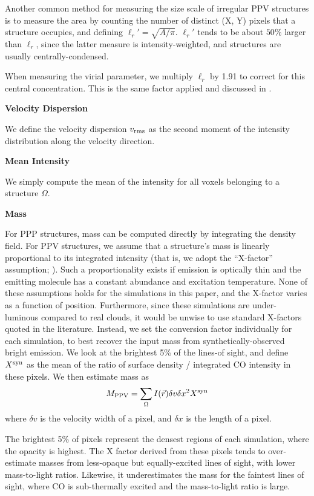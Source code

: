 Another common method for measuring the size scale of irregular PPV structures is to measure the area by counting the
number of distinct (X, Y) pixels that a structure occupies, and defining $\ell_r' = \sqrt{A/\pi}$. $\ell_r'$ tends to be about $50\%$
larger than $\ell_r$, since the latter measure is intensity-weighted, and structures are usually centrally-condensed.

When measuring the virial parameter, we multiply $\ell_r$ by 1.91 to correct for this central concentration. This is the same factor
applied and discussed in \cite{http://adsabs.harvard.edu/abs/2008ApJ...679.1338R}.

\textbf{Velocity Dispersion}

We define the velocity dispersion $v_{\rm rms}$ as the second moment of the intensity distribution along the velocity direction.

\textbf{Mean Intensity}

  We simply compute the mean of the intensity for all voxels belonging to a structure $\Omega$.

 \textbf{Mass}

For PPP structures, mass can be computed directly by integrating the density field. For PPV structures, we assume that a structure's mass is linearly proportional
to its integrated intensity (that is, we adopt the ``X-factor'' assumption; \citealt{http://adsabs.harvard.edu/abs/2008ApJ...679..481P}).
Such a proportionality exists if emission is optically thin and the emitting molecule has a constant abundance and excitation temperature. None of these assumptions holds for the simulations in this paper, and the X-factor varies as a function of position. Furthermore, since these simulations are under-luminous compared to real clouds, it would be unwise to use standard X-factors quoted in the literature. Instead, we set the conversion factor individually for each simulation, to best recover the input mass from synthetically-observed bright emission. We look at the brightest 5\% of the lines-of sight, and define $X^{\rm syn}$ as the mean of the ratio of surface density / integrated CO intensity in these pixels. We then estimate mass as
\begin{equation}
M_{\rm PPV} = \sum_{\Omega} I(\vec{r}) \delta v \delta x^2 X^{\rm syn}
\label{eq:xfactor_mass}
\end{equation}
where $\delta v$ is the velocity width of a pixel, and $\delta x$ is the length of a pixel.

The brightest 5\% of pixels represent the densest regions of each simulation, where the opacity is highest. The X factor derived from these pixels tends to over-estimate masses from less-opaque but equally-excited lines of sight, with lower mass-to-light ratios. Likewise, it underestimates the mass for the faintest lines of sight, where CO is sub-thermally excited and the mass-to-light ratio is large.
